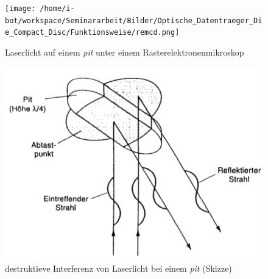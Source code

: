 \begin{figure}[h]
  \begin{center}
      \begin{minipage}[t]{0.3\textwidth}
        \begin{center}
            \texttt{[image: /home/i-bot/workspace/Seminararbeit/Bilder/Optische\_Datentraeger\_Die\_Compact\_Disc/Funktionsweise/remcd.png]}
            \caption[Laserlicht auf einem \textit{pit} unter einem Rasterelektronenmikroskop \newline Roth, Klaus: CD, DVD0 \& Co.: Die Chemie der schillernden Scheiben, in: Chemie in unserer Zeit (41/2007), S. 340]{Laserlicht auf einem \textit{pit} unter einem Rasterelektronenmikroskop}
            \label{fig:cdrem}
        \end{center}
      \end{minipage}
      \hspace{0.025\textwidth}
      \begin{minipage}[t]{0.3\textwidth}
        \begin{center}
            \includegraphics[height=0.1\textheight]{Bilder/Optische_Datentraeger_Die_Compact_Disc/Funktionsweise/cdlaser.png}
            \caption[destruktieve Interferenz von Laserlicht bei einem \textit{pit} (Skizze) \newline \url{http://www.muenster.de/~asshoff/physik/cd/image50.gif} (zuletzt aufgerufen am 07.08.2015)]{destruktieve Interferenz von Laserlicht bei einem \textit{pit} (Skizze)}
            \label{fig:cdlaser}
        \end{center}
      \end{minipage}

\end{center}
\end{figure}
